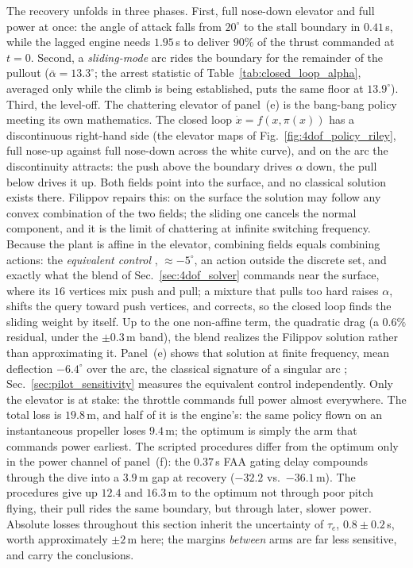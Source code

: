 \documentclass[journal ]{new-aiaa}
\begin{document}
The recovery unfolds in three phases. First, full nose-down
elevator and full power at once: the angle of attack falls from
$20^\circ$ to the stall boundary in $0.41$\,s, while the lagged
engine needs $1.95$\,s to deliver $90\%$ of the thrust commanded at
$t = 0$. Second, a \emph{sliding-mode} arc rides the boundary for
the remainder of the pullout ($\bar{\alpha} = 13.3^\circ$; the
arrest statistic of Table~\ref{tab:closed_loop_alpha}, averaged
only while the climb is being established, puts the same floor at
$13.9^\circ$). Third, the level-off. The chattering elevator of
panel~(e) is the bang-bang policy meeting its own mathematics.
The closed loop $\dot{x} = f(x, \pi(x))$ has a discontinuous
right-hand side (the elevator maps of
Fig.~\ref{fig:4dof_policy_riley}, full nose-up against full
nose-down across the white curve), and on the arc the
discontinuity attracts: the push above the boundary drives
$\alpha$ down, the pull below drives it up. Both fields point into
the surface, and no classical solution exists there. Filippov
\cite{Filippov1988} repairs this: on the surface the solution may
follow any convex combination of the two fields; the sliding one
cancels the normal component, and it is the limit of chattering at
infinite switching frequency. Because the plant is affine in the
elevator, combining fields equals combining actions: the
\textit{equivalent control} \cite{Utkin1977}, $\approx -5^\circ$,
an action outside the discrete set, and exactly what the blend of
Sec.~\ref{sec:4dof_solver} commands near the surface, where its
$16$ vertices mix push and pull; a mixture that pulls too hard
raises $\alpha$, shifts the query toward push vertices, and
corrects, so the closed loop finds the sliding weight by itself.
Up to the one non-affine term, the quadratic drag (a $0.6\%$
residual, under the $\pm 0.3$\,m band), the blend realizes the
Filippov solution rather than approximating it. Panel~(e) shows
that solution at finite frequency, mean deflection $-6.4^\circ$
over the arc, the classical signature of a singular arc
\cite{BrysonHo1975}; Sec.~\ref{sec:pilot_sensitivity} measures the
equivalent control independently. Only the elevator is at stake:
the throttle commands full power almost everywhere. The total loss is $19.8$\,m, and half of it is
the engine's: the same policy flown on an instantaneous propeller
loses $9.4$\,m; the optimum is simply the arm that commands power
earliest. The scripted procedures differ from the
optimum only in the power channel of panel~(f): the
$0.37$\,s FAA gating delay compounds
through the dive into a $3.9$\,m gap at recovery ($-32.2$ vs.\
$-36.1$\,m). The procedures give up $12.4$ and $16.3$\,m to the
optimum not through poor pitch flying, their pull rides the same
boundary, but through later, slower power. Absolute losses
throughout this section inherit the uncertainty of $\tau_e$,
$0.8 \pm 0.2$\,s, worth approximately $\pm 2$\,m here; the margins
\emph{between} arms are far less sensitive, and carry the
conclusions.
\end{document}
